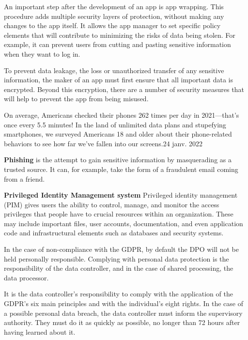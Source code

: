 \begin{itemize}
An important step after the development of an app is app wrapping. This procedure adds multiple security layers of protection, without making any changes to the app itself. It allows the app manager to set specific policy elements that will contribute to minimizing the risks of data being stolen. For example, it can prevent users from cutting and pasting sensitive information when they want to log in.

\blindtext




To prevent data leakage, the loss or unauthorized transfer of any sensitive information, the maker of an app must first ensure that all important data is encrypted. Beyond this encryption, there are a number of security measures that will help to prevent the app from being misused.



On average, Americans checked their phones 262 times per day in 2021—that's once every 5.5 minutes! In the land of unlimited data plans and stupefying smartphones, we surveyed Americans 18 and older about their phone-related behaviors to see how far we've fallen into our screens.24 janv. 2022

 \textbf{Phishing} is the attempt to gain sensitive information by masquerading as a trusted source. It can, for example, take the form of a fraudulent email coming from a friend.


 \textbf{Privileged Identity Management system}
 Privileged identity management (PIM) gives users the ability to control, manage, and monitor the access privileges that people have to crucial resources within an organization. These may include important files, user accounts, documentation, and even application code and infrastructural elements such as databases and security systems.



In the case of non-compliance with the GDPR, by default the DPO will not be held personally responsible. Complying with personal data protection is the responsibility of the data controller, and in the case of shared processing, the data processor.

It is the data controller’s responsibility to comply with the application of the GDPR’s six main principles and with the individual’s eight rights.
In the case of a possible personal data breach, the data controller must inform the supervisory authority. They must do it as quickly as possible, no longer than 72 hours after having learned about it.




\end{itemize}
